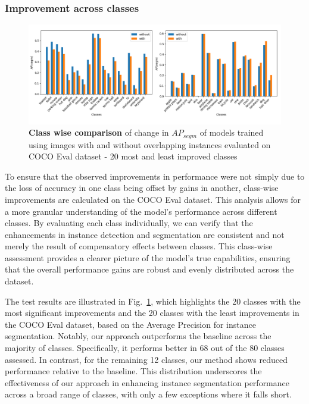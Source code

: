 \subsubsection{Improvement across classes}
\begin{figure}
	\centering
	\includegraphics[width=1.05\textwidth]{Images/main/overlap_classes.png}
	\caption[\textbf{Training without overlapping instances - Class wise comparison}]{\textbf{Class wise comparison} of change in \(AP_{segm}\) of models trained using images with and without overlapping instances evaluated on COCO Eval dataset - 20 most and least improved classes}
	\label{fig:overlap_classes}
\end{figure}

To ensure that the observed improvements in performance were not simply due to the loss of accuracy in one class being offset by gains in another, class-wise improvements are calculated on the COCO Eval dataset. This analysis allows for a more granular understanding of the model’s performance across different classes. By evaluating each class individually, we can verify that the enhancements in instance detection and segmentation are consistent and not merely the result of compensatory effects between classes. This class-wise assessment provides a clearer picture of the model's true capabilities, ensuring that the overall performance gains are robust and evenly distributed across the dataset.

The test results are illustrated in Fig.~\ref{fig:overlap_classes}, which highlights the 20 classes with the most significant improvements and the 20 classes with the least improvements in the COCO Eval dataset, based on the Average Precision for instance segmentation. Notably, our approach outperforms the baseline across the majority of classes. Specifically, it performs better in 68 out of the 80 classes assessed. In contrast, for the remaining 12 classes, our method shows reduced performance relative to the baseline. This distribution underscores the effectiveness of our approach in enhancing instance segmentation performance across a broad range of classes, with only a few exceptions where it falls short.

